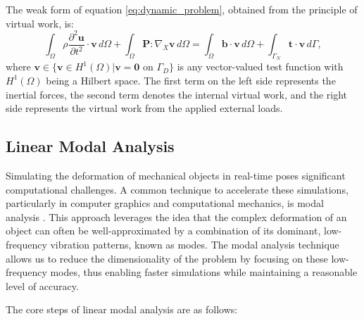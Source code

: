 The weak form of equation \eqref{eq:dynamic_problem}, obtained from the principle of virtual work, is:
\begin{equation}
    \int_{\Omega} \rho \frac{\partial^2 \bm{u}}{\partial t^2} \cdot \bm{v} \, d\Omega + \int_{\Omega} \bm{P} : \nabla_X \bm{v} \, d\Omega = \int_{\Omega} \bm{b} \cdot \bm{v} \, d\Omega + \int_{\Gamma_N} \bm{t} \cdot \bm{v} \, d\Gamma,
\label{eq:weak_form}
\end{equation}
where $\bm{v} \in \{\bm{v} \in H^1(\Omega) | \bm{v} = \bm{0} \text{ on } \Gamma_D\}$ is any vector-valued test function with $H^1(\Omega)$ being a Hilbert space. The first term on the left side represents the inertial forces, the second term denotes the internal virtual work, and the right side represents the virtual work from the applied external loads.


\subsection{Linear Modal Analysis}
\label{sec:linear_modes}

Simulating the deformation of mechanical objects in real-time poses significant computational challenges. A common technique to accelerate these simulations, particularly in computer graphics and computational mechanics, is modal analysis \cite{Pentland_Williams_1989}. This approach leverages the idea that the complex deformation of an object can often be well-approximated by a combination of its dominant, low-frequency vibration patterns, known as modes. The modal analysis technique allows us to reduce the dimensionality of the problem by focusing on these low-frequency modes, thus enabling faster simulations while maintaining a reasonable level of accuracy.


The core steps of linear modal analysis are as follows:

